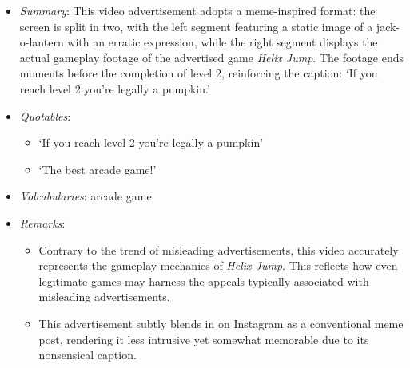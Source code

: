 \documentclass[a4paper, 12pt, mla]{homework}
\begin{document}
\begin{abibliography}
		
	\begin{itemize}
		\item \textit{Summary}:
			This video advertisement adopts a meme-inspired format: the screen is split in two, with the left segment featuring a static image of a jack-o-lantern with an erratic expression, while the right segment displays the actual gameplay footage of the advertised game \textit{Helix Jump}. 
			The footage ends moments before the completion of level 2, reinforcing the caption: `If you reach level 2 you're legally a pumpkin.'
		\item \textit{Quotables}:
			\begin{itemize}
				\item `If you reach level 2 you're legally a pumpkin' 
				\item `The best arcade game!'
			\end{itemize}
		\item \textit{Volcabularies}: arcade game
		\item \textit{Remarks}:
			\begin{itemize}
				\item Contrary to the trend of misleading advertisements, this video accurately represents the gameplay mechanics of \textit{Helix Jump}. 
					This reflects how even legitimate games may harness the appeals typically associated with misleading advertisements.
				\item This advertisement subtly blends in on Instagram as a conventional meme post, rendering it less intrusive yet somewhat memorable due to its nonsensical caption.
			\end{itemize}
	\end{itemize}


\end{abibliography}
\end{document}
